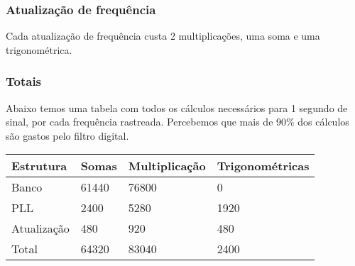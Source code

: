\documentclass[a4paper, 12pt]{book}
\begin{document}
\subsubsection{Atualização de frequência}

\indent Cada atualização de frequência custa 2 multiplicações, uma soma e uma trigonométrica.

\subsubsection{Totais}

Abaixo temos uma tabela com todos os cálculos necessários para 1 segundo de sinal, por cada frequência rastreada. Percebemos que mais de 90\% dos cálculos são gastos pelo filtro digital.

\begin{table}[H]
	\centering
	\begin{tabular}{l|l|l|l}
		Estrutura   & Somas & Multiplicação & Trigonométricas \\
		\hline 
		Banco       & 61440 & 76800         & 0               \\
		PLL         & 2400  & 5280          & 1920            \\
		Atualização & 480   & 920           & 480             \\
		\hline
		Total       & 64320 & 83040         & 2400           
	\end{tabular}
\end{table}
\end{document}
